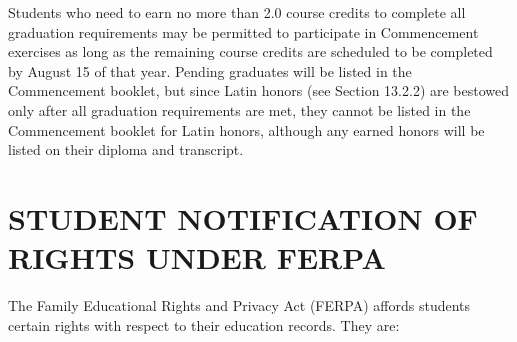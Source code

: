 \documentclass[
  letterpaper,
]{scrbook}
\begin{document}
Students who need to earn no more than 2.0 course credits to complete
all graduation requirements may be permitted to participate in
Commencement exercises as long as the remaining course credits are
scheduled to be completed by August 15 of that year. Pending graduates
will be listed in the Commencement booklet, but since Latin honors (see
Section 13.2.2) are bestowed only after all graduation requirements are
met, they cannot be listed in the Commencement booklet for Latin honors,
although any earned honors will be listed on their diploma and
transcript.

\chapter{STUDENT NOTIFICATION OF RIGHTS UNDER
FERPA}\label{sec-ferpa-rights}

The Family Educational Rights and Privacy Act (FERPA) affords students
certain rights with respect to their education records. They are:
\end{document}
